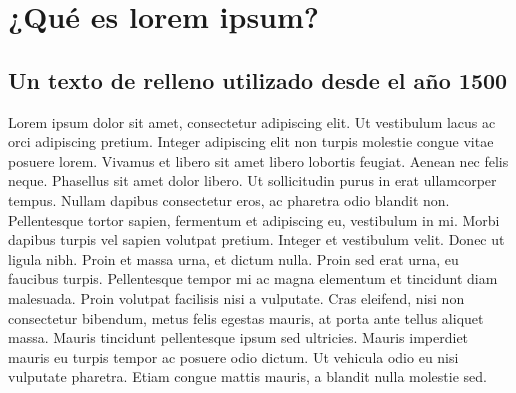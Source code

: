 \documentclass[11pt,a4paper]{report}
\begin{document}


\tableofcontents






\chapter{¿Qué es lorem ipsum?}


%	
\thispagestyle{empty}



\section[Texto de relleno]{Un texto de relleno utilizado desde el año 1500}


Lorem ipsum dolor sit amet, consectetur adipiscing elit. Ut vestibulum lacus ac orci adipiscing pretium. Integer adipiscing elit non turpis molestie congue vitae posuere lorem. Vivamus et libero sit amet libero lobortis feugiat. Aenean nec felis neque. Phasellus sit amet dolor libero. Ut sollicitudin purus in erat ullamcorper tempus. Nullam dapibus consectetur eros, ac pharetra odio blandit non. Pellentesque tortor sapien, fermentum et adipiscing eu, vestibulum in mi. Morbi dapibus turpis vel sapien volutpat pretium. Integer et vestibulum velit. Donec ut ligula nibh. Proin et massa urna, et dictum nulla. Proin sed erat urna, eu faucibus turpis. Pellentesque tempor mi ac magna elementum et tincidunt diam malesuada. Proin volutpat facilisis nisi a vulputate. Cras eleifend, nisi non consectetur bibendum, metus felis egestas mauris, at porta ante tellus aliquet massa. Mauris tincidunt pellentesque ipsum sed ultricies. Mauris imperdiet mauris eu turpis tempor ac posuere odio dictum. Ut vehicula odio eu nisi vulputate pharetra. Etiam congue mattis mauris, a blandit nulla molestie sed.
\end{document}
